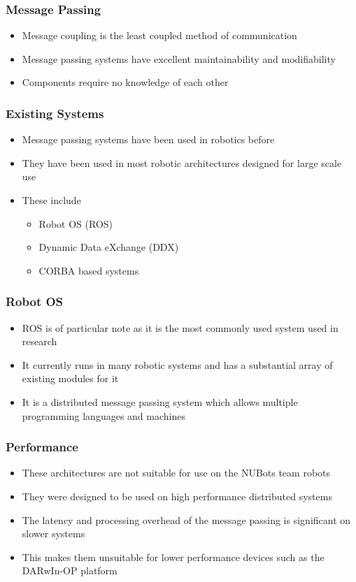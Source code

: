 \documentclass{beamer}
\begin{document}
\begin{frame}
	\frametitle{Message Passing}
	\begin{itemize}
		\item Message coupling is the least coupled method of communication
		\item Message passing systems have excellent maintainability and modifiability
		\item Components require no knowledge of each other
	\end{itemize}
\end{frame}

\begin{frame}
	\frametitle{Existing Systems}
	\begin{itemize}
		\item Message passing systems have been used in robotics before
		\item They have been used in most robotic architectures designed for large scale use
		\item These include
		\begin{itemize}
			\item Robot OS (ROS)
			\item Dynamic Data eXchange (DDX)
			\item CORBA based systems
		\end{itemize}
	\end{itemize}
\end{frame}

\begin{frame}
	\frametitle{Robot OS}
	\begin{itemize}
		\item ROS is of particular note as it is the most commonly used system used in research
		\item It currently runs in many robotic systems and has a substantial array of existing modules for it
		\item It is a distributed message passing system which allows multiple programming languages and machines
	\end{itemize}
\end{frame}

\begin{frame}
	\frametitle{Performance}
	\begin{itemize}
		\item These architectures are not suitable for use on the NUBots team robots
		\item They were designed to be used on high performance distributed systems
		\item The latency and processing overhead of the message passing is significant on slower systems
		\item This makes them unsuitable for lower performance devices such as the DARwIn-OP platform
	\end{itemize}
\end{frame}
\end{document}

